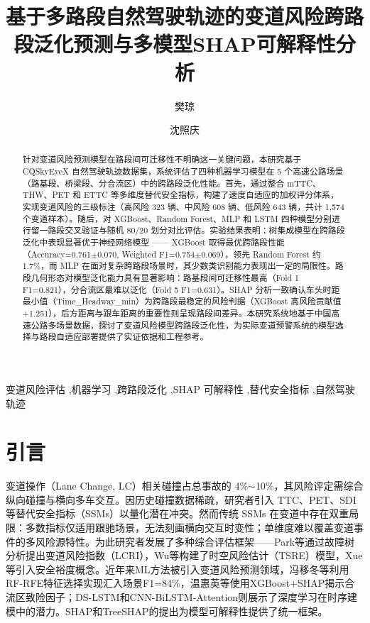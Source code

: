 \documentclass[preprint,review,12pt,a4paper]{elsarticle}
\begin{document}
\begin{frontmatter}

\title{基于多路段自然驾驶轨迹的变道风险跨路段泛化预测与多模型SHAP可解释性分析}

\author{樊琼}
\author{沈照庆}

\begin{abstract}
针对变道风险预测模型在路段间可迁移性不明确这一关键问题，本研究基于 CQSkyEyeX 自然驾驶轨迹数据集，系统评估了四种机器学习模型在 5 个高速公路场景（路基段、桥梁段、分合流区）中的跨路段泛化性能。首先，通过整合 mTTC、THW、PET 和 ETTC 等多维度替代安全指标，构建了速度自适应的加权评分体系，实现变道风险的三级标注（高风险 323 辆、中风险 608 辆、低风险 643 辆，共计 1,574 个变道样本）。随后，对 XGBoost、Random Forest、MLP 和 LSTM 四种模型分别进行留一路段交叉验证与随机 80/20 划分对比评估。实验结果表明：树集成模型在跨路段泛化中表现显著优于神经网络模型 —— XGBoost 取得最优跨路段性能（Accuracy=0.761$\pm$0.070, Weighted F1=0.754$\pm$0.069），领先 Random Forest 约 1.7\%，而 MLP 在面对复杂跨路段场景时，其少数类识别能力表现出一定的局限性。路段几何形态对模型泛化能力具有显著影响：路基段间可迁移性最高（Fold 1 F1=0.821），分合流区最难以泛化（Fold 5 F1=0.631）。SHAP 分析一致确认车头时距最小值（Time\_Headway\_min）为跨路段最稳定的风险判据（XGBoost 高风险贡献值 +1.251），后方距离与跟车距离的重要性则呈现路段间差异。本研究系统地基于中国高速公路多场景数据，探讨了变道风险模型跨路段泛化性，为实际变道预警系统的模型选择与路段自适应部署提供了实证依据和工程参考。
\end{abstract}

\begin{keyword}
变道风险评估 \sep 机器学习 \sep 跨路段泛化 \sep SHAP 可解释性 \sep 替代安全指标 \sep 自然驾驶轨迹
\end{keyword}

\end{frontmatter}

\section{引言}

变道操作（Lane Change, LC）相关碰撞占总事故的 4\%$\sim$10\%\cite{C01,C02}，其风险评定需综合纵向碰撞与横向多车交互\cite{C03}。因历史碰撞数据稀疏，研究者引入 TTC\cite{C05}、PET\cite{C04}、SDI\cite{C06}等替代安全指标（SSMs）以量化潜在冲突。然而传统 SSMs 在变道中存在双重局限：多数指标仅适用跟驰场景，无法刻画横向交互时变性\cite{C03,C07}；单维度难以覆盖变道事件的多风险源特性\cite{C01}。为此研究者发展了多种综合评估框架——Park等\cite{C08}通过故障树分析提出变道风险指数（LCRI），Wu等\cite{C03}构建了时空风险估计（TSRE）模型，Xue等\cite{C02}引入安全裕度概念。近年来ML方法被引入变道风险预测领域，冯移冬等\cite{C09}利用RF-RFE特征选择实现汇入场景F1=84\%，温惠英等\cite{C10}使用XGBoost+SHAP揭示合流区致险因子；DS-LSTM\cite{C11}和CNN-BiLSTM-Attention\cite{C12}则展示了深度学习在时序建模中的潜力。SHAP\cite{C13}和TreeSHAP\cite{C14}的提出为模型可解释性提供了统一框架。
\end{document}
